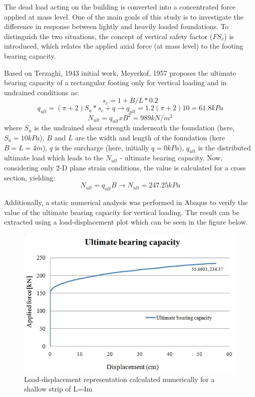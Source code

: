	The dead load acting on the building is converted into a concentrated force applied at mass level. One of the main goals of this study is to investigate the difference in response between lightly and heavily loaded foundations. To distinguish the two situations, the concept of vertical safety factor ($FS_v$) is introduced, which relates the applied axial force (at mass level) to the footing bearing capacity.
	
	Based on Terzaghi, 1943 initial work, Meyerkof, 1957\cite{meyerhof1957ultimate} proposes the ultimate bearing capacity of a rectangular footing only for vertical loading and in undrained conditions as:
	\begin{equation}
		s_c=1+B/L*0.2
	\end{equation}
	\begin{equation}
		q_{ult}=(\pi +2)S_u*s_c + q \longrightarrow q_{ult}=1.2 (\pi+2) 10= 61.8kPa
	\end{equation}
	\begin{equation}
		N_{ult}=q_{ult}xB^2=989 kN/m^2
	\end{equation}
	where $S_u$ is the undrained shear strength underneath the foundation (here, $S_u=10kPa$), $B$ and $L$ are the width and length of the foundation (here $B=L=4m$), $q$ is the surcharge (here, initially $q=0kPa$), $q_{ult}$ is the distributed ultimate load which leads to the $N_{ult}$ - ultimate bearing capacity. Now, considering only 2-D plane strain conditions, the value is calculated for a cross section, yielding:
	\begin{equation}
		N_{ult}=q_{ult} B \longrightarrow N_{ult}=247.25 kPa
	\end{equation}
	
	Additionally, a static numerical analysis was performed in Abaqus to verify the value of the ultimate bearing capacity for vertical loading. The result can be extracted using a load-displacement plot which can be seen in the figure below.


		\begin{figure}[!h]
			\centering
			\includegraphics[width=0.5\linewidth]{"ultimatebearing"}
			\caption{Load-displacement representation calculated numerically for a shallow strip of L=4m}
			\label{bearing}
		\end{figure}

